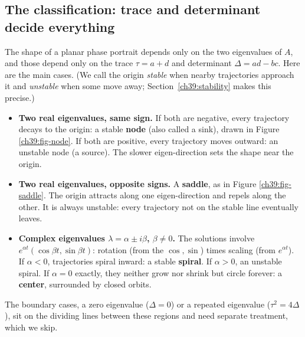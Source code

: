 \subsection{The classification: trace and determinant decide everything}

The shape of a planar phase portrait depends only on the two
eigenvalues of $A$, and those depend only on the trace $\tau = a+d$ and
determinant $\Delta = ad-bc$. Here are the main cases. (We call the origin
\emph{stable} when nearby trajectories approach it and \emph{unstable} when
some move away; Section~\ref{ch39:stability} makes this precise.)

\begin{itemize}
\item \textbf{Two real eigenvalues, same sign.} If both are negative, every
trajectory decays to the origin: a stable \textbf{node} (also called a sink), drawn in
Figure \ref{ch39:fig-node}. If both are
positive, every trajectory moves outward: an unstable node (a source). The slower
eigen-direction sets the shape near the origin.

\item \textbf{Two real eigenvalues, opposite signs.} A \textbf{saddle}, as in
Figure \ref{ch39:fig-saddle}. The origin attracts along one eigen-direction and
repels along the other. It is always unstable: every trajectory not on the
stable line eventually leaves.

\item \textbf{Complex eigenvalues $\lambda = \alpha \pm i\beta$, $\beta\ne0$.}
The solutions involve $e^{\alpha t}(\cos\beta t, \sin\beta t)$: rotation
(from the $\cos,\sin$) times scaling (from $e^{\alpha t}$). If $\alpha<0$,
trajectories spiral inward: a stable \textbf{spiral}. If $\alpha>0$, an unstable
spiral. If $\alpha = 0$ exactly, they neither grow nor shrink but circle
forever: a \textbf{center}, surrounded by closed orbits.
\end{itemize}
The boundary cases, a zero eigenvalue ($\Delta=0$) or a repeated eigenvalue
($\tau^2=4\Delta$), sit on the dividing lines between these regions and need
separate treatment, which we skip.

